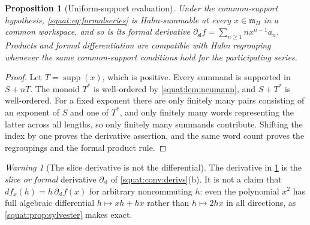 \documentclass[11pt,letterpaper]{article}
\numberwithin{equation}{section}
\newtheorem{proposition}[proposition]{Proposition}
\theoremstyle{definition}
\theoremstyle{remark}
\newtheorem{warning}[warning]{Warning}
\newcommand{\mm}{\mathfrak m}
\newcommand{\supp}{\operatorname{supp}}
\newcommand{\dsl}{\partial_{\mathrm{sl}}}
\begin{document}
\begin{proposition}[Uniform-support evaluation]\label{squat:prop:evaluation}
Under the common-support hypothesis, \cref{squat:eq:formalseries} is Hahn-summable at every
$x\in\mm_H$ in a common workspace, and so is its formal derivative
$\dsl f=\sum_{n\ge1}nx^{n-1}a_n$. Products and formal differentiation are compatible with
Hahn regrouping whenever the same common-support conditions hold for the participating
series.
\end{proposition}
\begin{proof}
Let $T=\supp(x)$, which is positive. Every summand is supported in $S+nT$. The monoid
$T^*$ is well-ordered by \cref{squat:lem:neumann}, and $S+T^*$ is well-ordered. For a
fixed exponent there are only finitely many pairs consisting of an exponent of $S$ and one
of $T^*$, and only finitely many words representing the latter across all lengths, so only
finitely many summands contribute. Shifting the index by one proves the derivative
assertion, and the same word count proves the regroupings and the formal product rule.
\end{proof}

\begin{warning}[The slice derivative is not the differential]\label{squat:warn:slicederiv}
The derivative in \cref{squat:prop:evaluation} is the \emph{slice or formal} derivative
$\dsl$ of \cref{squat:conv:derivs}(b). It is not a claim that $df_x(h)=h\,\dsl f(x)$ for
arbitrary noncommuting $h$: even the polynomial $x^2$ has full algebraic differential
$h\mapsto xh+hx$ rather than $h\mapsto2hx$ in all directions, as
\cref{squat:prop:sylvester} makes exact.
\end{warning}
\end{document}
